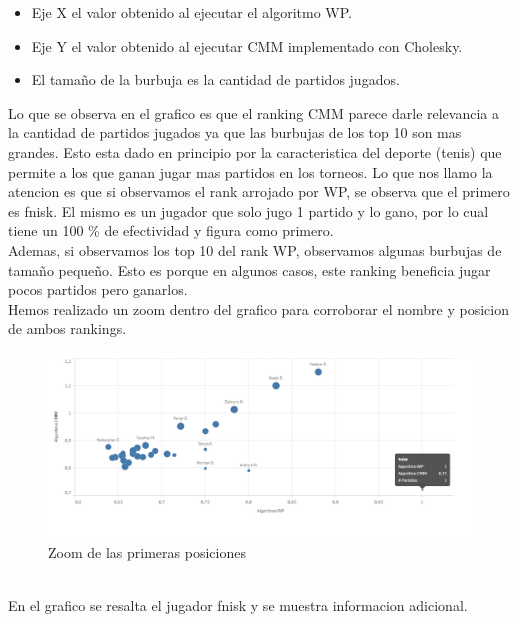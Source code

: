 \begin{itemize}
	\item Eje X el valor obtenido al ejecutar el algoritmo WP.
	\item Eje Y el valor obtenido al ejecutar CMM implementado con Cholesky.
	\item El tamaño de la burbuja es la cantidad de partidos jugados.
\end{itemize}

	
Lo que se observa en el grafico es que el ranking CMM parece darle relevancia a la cantidad de partidos jugados ya que las burbujas de los top 10 son mas grandes.
Esto esta dado en principio por la caracteristica del deporte (tenis) que permite a los que ganan jugar mas partidos en los torneos. 
Lo que nos llamo la atencion es que si observamos el rank arrojado por WP, se observa que el primero es fnisk. El mismo es un jugador que solo jugo 1 partido y lo gano, 
por lo cual tiene un 100 \% de efectividad y figura como primero. \\
Ademas, si observamos los top 10 del rank WP, observamos algunas burbujas de tamaño pequeño. Esto es porque en algunos casos, este ranking beneficia jugar pocos 
partidos pero ganarlos.
\\

Hemos realizado un zoom dentro del grafico para corroborar el nombre y posicion de ambos rankings.
\\

\begin{figure}[H]
\centering
\includegraphics[width=1\textwidth]{IMG/comparativa WP - CMM zoom.png}
\caption{Zoom de las primeras posiciones}
\label{fig:Zoom de las primeras posiciones}
\end{figure}

\\ 
En el grafico se resalta el jugador fnisk y se muestra informacion adicional.
\\

